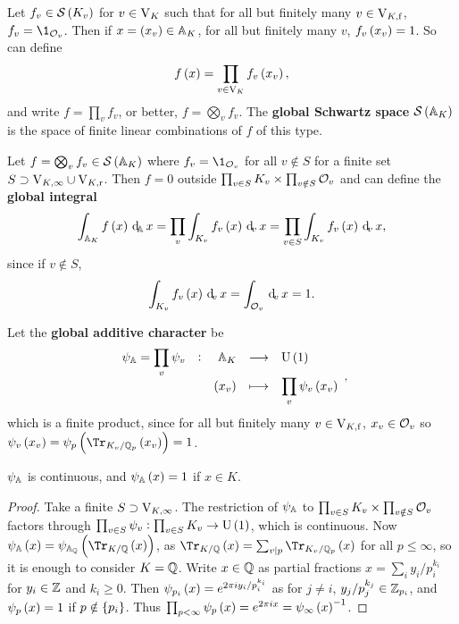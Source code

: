 \begin{definition*}
Let $ f_v \in \SSS\br{K_v} $ for $ v \in \V_K $ such that for all but finitely many $ v \in \V_{K, \f} $, $ f_v = \1_{\OOO_v} $. Then if $ x = \br{x_v} \in \AA_K $, for all but finitely many $ v $, $ f_v\br{x_v} = 1 $. So can define
$$ f\br{x} = \prod_{v \in \V_K} f_v\br{x_v}, $$
and write $ f = \prod_v f_v $, or better, $ f = \bigotimes_v f_v $. The \textbf{global Schwartz space} $ \SSS\br{\AA_K} $ is the space of finite linear combinations of $ f $ of this type.
\end{definition*}

\begin{definition*}
Let $ f = \bigotimes_v f_v \in \SSS\br{\AA_K} $ where $ f_v = \1_{\OOO_v} $ for all $ v \notin S $ for a finite set $ S \supset \V_{K, \infty} \cup \V_{K, \r} $. Then $ f = 0 $ outside $ \prod_{v \in S} K_v \times \prod_{v \notin S} \OOO_v $ and can define the \textbf{global integral}
$$ \intA{f\br{x}}{x} = \prod_v \intv{f_v\br{x}}{x} = \prod_{v \in S} \intv{f_v\br{x}}{x}, $$
since if $ v \notin S $,
$$ \intv{f_v\br{x}}{x} = \intv[\OOO_v]{}{x} = 1. $$
\end{definition*}

\begin{definition*}
Let the \textbf{global additive character} be
$$ \function[\psi_\AA = \prod_v \psi_v]{\AA_K}{\U\br{1}}{\br{x_v}}{\prod_v \psi_v\br{x_v}}, $$
which is a finite product, since for all but finitely many $ v \in \V_{K, \f} $, $ x_v \in \OOO_v $ so $ \psi_v\br{x_v} = \psi_p\br{\Tr_{K_v / \QQ_p}\br{x_v}} = 1 $.
\end{definition*}

\pagebreak

\begin{proposition}
$ \psi_\AA $ is continuous, and $ \psi_\AA\br{x} = 1 $ if $ x \in K $.
\end{proposition}

\begin{proof}
Take a finite $ S \supset \V_{K, \infty} $. The restriction of $ \psi_\AA $ to $ \prod_{v \in S} K_v \times \prod_{v \notin S} \OOO_v $ factors through $ \prod_{v \in S} \psi_v : \prod_{v \in S} K_v \to \U\br{1} $, which is continuous. Now $ \psi_\AA\br{x} = \psi_{\AA_\QQ}\br{\Tr_{K / \QQ}\br{x}} $, as $ \Tr_{K / \QQ}\br{x} = \sum_{v \mid p} \Tr_{K_v / \QQ_p}\br{x} $ for all $ p \le \infty $, so it is enough to consider $ K = \QQ $. Write $ x \in \QQ $ as partial fractions $ x = \sum_i y_i / p_i^{k_i} $ for $ y_i \in \ZZ $ and $ k_i \ge 0 $. Then $ \psi_{p_i}\br{x} = e^{2\pi iy_i / p_i^{k_i}} $ as for $ j \ne i $, $ y_j / p_j^{k_j} \in \ZZ_{p_i} $, and $ \psi_p\br{x} = 1 $ if $ p \notin \cbr{p_i} $. Thus $ \prod_{p < \infty} \psi_p\br{x} = e^{2\pi ix} = \psi_\infty\br{x}^{-1} $.
\end{proof}

